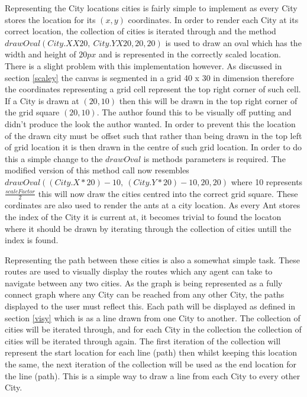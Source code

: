Representing the City locations cities is fairly simple to implement as every City stores the location for its $(x,y)$ coordinates. In order to render each City at its correct location, the collection of cities is iterated through and the method $drawOval(City.X X 20,\ City.Y X 20, 20, 20 )$ is used to draw an oval which has the width and height of $20px$ and is represented in the correctly scaled location. There is a slight problem with this implementation however. As discussed in section \ref{scaley} the canvas is segmented in a grid 40 x 30 in dimension therefore the coordinates representing a grid cell represent the top right corner of such cell. If a City is drawn at $(20,10)$ then this will be drawn in the top right corner of the grid square $(20,10)$. The author found this to be visually off putting and didn’t produce the look the author wanted. In order to prevent this the location of the drawn city must be offset such that rather than being drawn in the top left of grid location it is then drawn in the centre of such grid location. In order to do this a simple change to the $drawOval$ is methods parameters is required. The modified version of this method call now resembles $drawOval((City.X * 20) - 10,\ (City.Y * 20) - 10, 20, 20 )$ where 10 represents $\frac{scaleFactor}{2}$ this will now draw the cities centred into the correct grid square. These cordinates are also used to render the ants at a city location. As every Ant stores the index of the City it is current at, it becomes trivial to found the locaton where it should be drawn by iterating through the collection of cities untill the index is found.

Representing the path between these cities is also a somewhat simple task. These routes are used to visually display the routes which any agent can take to navigate between any two cities. As the graph is being represented as a fully connect graph where any City can be reached from any other City, the paths displayed to the user must reflect this. Each path will be displayed as defined in section \ref{visy} which is as a line drawn from one City to another. The collection of cities will be iterated through, and for each City in the collection the collection of cities will be iterated through again. The first iteration of the collection will represent the start location for each line (path) then whilst keeping this location the same, the next iteration of the collection will be used as the end location for the line (path). This is a simple way to draw a line from each City to every other City.

